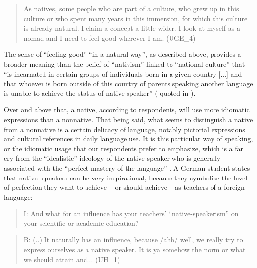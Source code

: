 \documentclass[output=paper]{../langscibook}
\begin{document}
\begin{quote}
As natives, some people who are part of a culture, who grew up in this culture or who spent many years in this immersion, for which this culture is already natural. I claim a concept a little wider. I look at myself as a nomad and I need to feel good wherever I am. (UGE\_4)
\end{quote}

The sense of “feeling good” “in a natural way”, as described above, provides a broader meaning than the belief of “nativism” linked to “national culture” that “is incarnated in certain groups of individuals born in a given country [...] and that whoever is born outside of this country of parents speaking another language is unable to achieve the status of native speaker” (\citealt[78]{Amin2004} quoted in \citealt[213]{Annous2011}). 

Over and above that, a native, according to respondents, will use more idiomatic expressions than a nonnative. That being said, what seems to distinguish a native from a nonnative is a certain delicacy of language, notably pictorial expressions and cultural references in daily language use. It is this particular way of speaking, or the idiomatic usage that our respondents prefer to emphasize, which is a far cry from the “idealistic” ideology of the native speaker who is generally associated with the “perfect mastery of the language” \citep{Annous2011}. A German student states that native- speakers can be very inspirational, because they symbolize the level of perfection they want to achieve – or should achieve – as teachers of a foreign language:

\begin{quote}
I: And what for an influence has your teachers’ “native-speakerism” on your scientific or academic education?  
\end{quote}

\begin{quote}
B: (..) It naturally has an influence, because /ahh/ well, we really try to express ourselves as a native speaker. It is ya somehow the norm or what we should attain and... (UH\_1) 
\end{quote}
\end{document}
